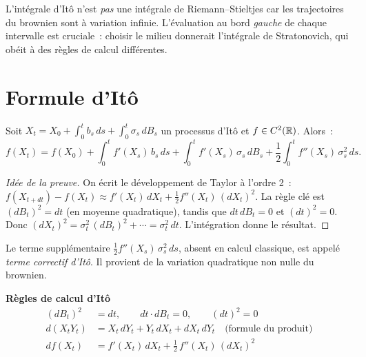 \begin{attention}
L'int\'egrale d'It\^o n'est \emph{pas} une int\'egrale de
Riemann--Stieltjes car les trajectoires du brownien sont \`a variation
infinie. L'\'evaluation au bord \emph{gauche} de chaque intervalle
est cruciale~: choisir le milieu donnerait l'int\'egrale de
Stratonovich, qui ob\'eit \`a des
r\`egles de calcul diff\'erentes.
\end{attention}

\section{Formule d'It\^o}
\label{sec:formule_ito}

\begin{theoreme}
\label{thm:ito_formula}
Soit $X_t = X_0 + \int_0^t b_s\,ds + \int_0^t \sigma_s\,dB_s$ un
processus d'It\^o et $f \in C^2(\mathbb{R})$. Alors~:
\[
  f(X_t) = f(X_0) + \int_0^t f'(X_s)\,b_s\,ds
    + \int_0^t f'(X_s)\,\sigma_s\,dB_s
    + \frac{1}{2}\int_0^t f''(X_s)\,\sigma_s^2\,ds.
\]
\end{theoreme}

\begin{proof}[Id\'ee de la preuve]
On \'ecrit le d\'eveloppement de Taylor \`a l'ordre 2~:
$f(X_{t+dt}) - f(X_t) \approx f'(X_t)\,dX_t + \frac{1}{2}f''(X_t)\,(dX_t)^2$.
La r\`egle cl\'e est $(dB_t)^2 = dt$ (en moyenne quadratique), tandis que
$dt\,dB_t = 0$ et $(dt)^2 = 0$. Donc
$(dX_t)^2 = \sigma_t^2\,(dB_t)^2 + \cdots = \sigma_t^2\,dt$.
L'int\'egration donne le r\'esultat.
\end{proof}

\begin{remarque}
Le terme suppl\'ementaire $\frac{1}{2}f''(X_s)\,\sigma_s^2\,ds$,
absent en calcul classique, est appel\'e \emph{terme correctif d'It\^o}.
Il provient de la variation quadratique non nulle du brownien.
\end{remarque}

\begin{formules}
\textbf{R\`egles de calcul d'It\^o}
\begin{align*}
  (dB_t)^2 &= dt, \qquad dt\cdot dB_t = 0, \qquad (dt)^2 = 0 \\[4pt]
  d(X_t Y_t) &= X_t\,dY_t + Y_t\,dX_t + dX_t\,dY_t
    \quad \text{(formule du produit)} \\[4pt]
  df(X_t) &= f'(X_t)\,dX_t + \tfrac{1}{2}\,f''(X_t)\,(dX_t)^2
\end{align*}
\end{formules}

